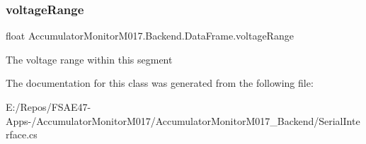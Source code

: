 \subsubsection{\texorpdfstring{voltage\+Range}{voltageRange}}
{\footnotesize\ttfamily float Accumulator\+Monitor\+M017.\+Backend.\+Data\+Frame.\+voltage\+Range\hspace{0.3cm}{\ttfamily [get]}}



The voltage range within this segment 



The documentation for this class was generated from the following file\+:\begin{DoxyCompactItemize}
\item 
E\+:/\+Repos/\+F\+S\+A\+E47-\/\+Apps-\//\+Accumulator\+Monitor\+M017/\+Accumulator\+Monitor\+M017\+\_\+\+Backend/Serial\+Interface.\+cs\end{DoxyCompactItemize}
